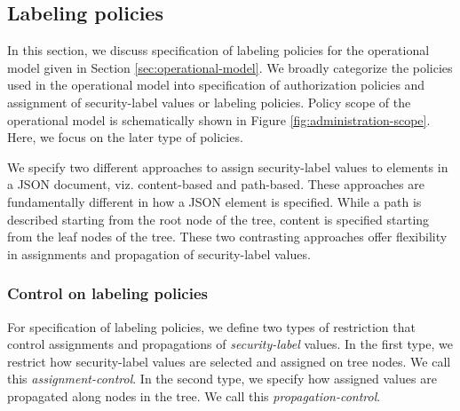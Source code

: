 \newcommand{\assignmentControl}{\textit{assignment-control}}
\newcommand{\propagationControl}{\textit{propagation-control}}
\subsection{Labeling policies}
\label{sec:administrative-model}
 


 
 In this section, we discuss specification of labeling policies for the operational model given in Section \ref{sec:operational-model}. We broadly categorize the policies used in the operational model into specification of authorization policies and assignment of security-label values or labeling policies. Policy scope of the operational model is schematically shown in Figure \ref{fig:administration-scope}. Here, we focus on the later type of policies.
 
  
 
 We specify two different approaches to assign security-label values to elements in a JSON document, viz. content-based and  path-based. These approaches are fundamentally different in how a JSON element is specified. While a path is described starting from the root node of the tree, content is specified starting from the leaf nodes of the tree. These two contrasting approaches offer flexibility in assignments and propagation of security-label values.
 
 
 \subsubsection{Control on labeling policies}
 
 

For specification of labeling policies, we define two types of restriction that control assignments and propagations of \textit{security-label} values. In the first type, we restrict how security-label values are selected and assigned on tree nodes. We call this \assignmentControl{}. In the second type, we specify how assigned values are propagated along nodes in the tree. We call this \propagationControl{}. 
 
